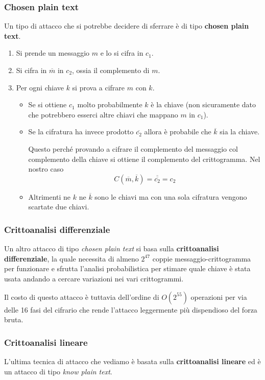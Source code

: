 \subsubsection{Chosen plain text}
Un tipo di attacco che si potrebbe decidere di sferrare \`e di tipo \textbf{chosen plain text}.
\begin{enumerate}
	\item Si prende un messaggio $m$ e lo si cifra in $c_1$.
	\item Si cifra in $\overline{m}$ in $c_2$, ossia il complemento di $m$.
	\item Per ogni chiave $k$ si prova a cifrare $m$ con $k$.
	      \begin{itemize}
		      \item Se si ottiene $c_1$ molto probabilmente $k$ \`e la chiave (non sicuramente dato che potrebbero
		            esserci altre chiavi che mappano $m$ in $c_1$).
		      \item Se la cifratura ha invece prodotto $\overline{c_2}$ allora \`e probabile che $\overline{k}$ sia
		            la chiave.

		            Questo perch\'e provando a cifrare il complemento del messaggio col complemento della chiave si
		            ottiene il complemento del crittogramma. Nel nostro caso
		            \[ C(\overline{m}, \overline{k}) = \overline{\overline{c_2}} = c_2 \]
		      \item Altrimenti ne $k$ ne $\overline{k}$ sono le chiavi ma con una sola cifratura vengono scartate
		            due chiavi.
	      \end{itemize}
\end{enumerate}

\subsubsection{Crittoanalisi differenziale}
Un altro attacco di tipo \emph{chosen plain text} si basa sulla \textbf{crittoanalisi differenziale}, la quale necessita
di almeno $2^{47}$ coppie messaggio-crittogramma per funzionare e sfrutta l'analisi probabilistica per stimare quale
chiave \`e stata usata andando a cercare variazioni nei vari crittogrammi.

Il costo di questo attacco \`e tuttavia dell'ordine di $O(2^{55})$ operazioni per via delle 16 fasi del cifrario che
rende l'attacco leggermente pi\`u dispendioso del forza bruta.

\subsubsection{Crittoanalisi lineare}
L'ultima tecnica di attacco che vediamo \`e basata sulla \textbf{crittoanalisi lineare} ed \`e un attacco di tipo
\emph{know plain text}.

